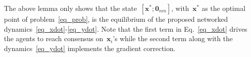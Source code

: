 \documentclass[letterpaper, 10pt, conference]{ieeeconf}
\newtheorem{rem}{Remark}
\def\mb{\mathbf}
\begin{document}
The above lemma only shows that the state~$[\mb{x}^*;\mb{0}_{nm}]$, with~$\mb{x}^*$ as the optimal point of problem~\eqref{eq_prob}, is the equilibrium of the proposed networked dynamics~\eqref{eq_xdot}-\eqref{eq_ydot}. 
Note that the first term in Eq.~\eqref{eq_xdot} drives the agents to reach consensus on~$\mb{x}_i$'s while the second term along with the dynamics~\eqref{eq_ydot} implements the gradient correction. 


\end{document}
